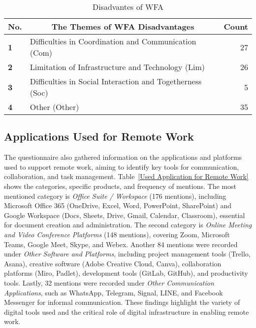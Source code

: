 \documentclass[a4paper, conference]{IEEEtran}
\begin{document}
\begin{table}
	\centering
	\caption{Disadvantes of WFA}
	\label{Disadvantages of WFA}
	\begin{tabular}{|p{}|p{}|r|}
		\hline
		\multicolumn{1}{|c|}{\textbf{No.}} & \multicolumn{1}{c|}{\textbf{The Themes of WFA Disadvantages}} & \multicolumn{1}{c|}{\textbf{Count}} \\ \hline
		\textbf{1}                 & Difficulties in Coordination and Communication (Com)   & 27 %
		\\ \hline
		\textbf{2}                 & Limitation of Infrastructure and Technology (Lim)    & 26 %
		\\ \hline
		\textbf{3}                 & Difficulties in Social Interaction and Togetherness (Soc) & 5 %
		\\ \hline
		\textbf{4}                 & Other (Other) & 35 %
		\\ \hline
	\end{tabular}
\end{table}

\subsection{Applications Used for Remote Work}
\label{sec:used-applications}

The questionnaire also gathered information on the applications and platforms used to support remote work, aiming to identify key tools for communication, collaboration, and task management. Table~\ref{Used Application for Remote Work} shows the categories, specific products, and frequency of mentions. The most mentioned category is \textit{Office Suite / Workspace} (176 mentions), including Microsoft Office 365 (OneDrive, Excel, Word, PowerPoint, SharePoint) and Google Workspace (Docs, Sheets, Drive, Gmail, Calendar, Classroom), essential for document creation and administration. The second category is \textit{Online Meeting and Video Conference Platforms} (148 mentions), covering Zoom, Microsoft Teams, Google Meet, Skype, and Webex. Another 84 mentions were recorded under \textit{Other Software and Platforms}, including project management tools (Trello, Asana), creative software (Adobe Creative Cloud, Canva), collaboration platforms (Miro, Padlet), development tools (GitLab, GitHub), and productivity tools. Lastly, 32 mentions were recorded under \textit{Other Communication Applications}, such as WhatsApp, Telegram, Signal, LINE, and Facebook Messenger for informal communication. These findings highlight the variety of digital tools used and the critical role of digital infrastructure in enabling remote work.
\end{document}
